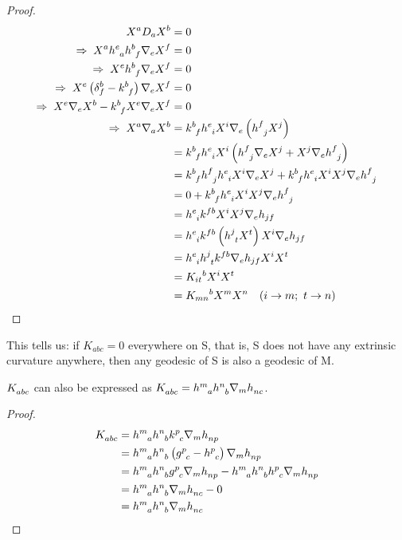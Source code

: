 \begin{proof}
    \begin{align*}
	 X^a D_a X^b &= 0 \\
	\Rightarrow\;  X^a \tt{h}{e}{a} \tt{h}{b}{f} \nabla_e X^f &= 0 \\
	\Rightarrow\;  X^e \tt{h}{b}{f} \nabla_e X^f &= 0 \\
	\Rightarrow\;  X^e \lera{\kron{b}{f} - \tt{k}{b}{f}} \nabla_e X^f &= 0 \\
	\Rightarrow\;  X^e \nabla_e X^b - \tt{k}{b}{f} X^e \nabla_e X^f &= 0 \\
	\Rightarrow\;  X^a \nabla_a X^b &= \tt{k}{b}{f} \tt{h}{e}{i} X^i \nabla_e \lera{\tt{h}{f}{j} X^j} \\
	&= \tt{k}{b}{f} \tt{h}{e}{i} X^i \lera{\tt{h}{f}{j} \nabla_e X^j + X^j \nabla_e \tt{h}{f}{j}} \\
	&= \tt{k}{b}{f} \tt{h}{f}{j} \tt{h}{e}{i} X^i \nabla_e X^j + \tt{k}{b}{f} \tt{h}{e}{i} X^i X^j \nabla_e \tt{h}{f}{j} \\
	&= 0 + \tt{k}{b}{f} \tt{h}{e}{i} X^i X^j \nabla_e \tt{h}{f}{j} \\
	&= \tt{h}{e}{i} k^{fb} X^i X^j \nabla_e h_{jf} \\
	&= \tt{h}{e}{i} k^{fb} \lera{\tt{h}{j}{t} X^t} X^i \nabla_e h_{jf} \\
	&= \tt{h}{e}{i} \tt{h}{j}{t} k^{fb} \nabla_e h_{jf} X^i X^t \\
	&= K_{it}{}^{b} X^i X^t \\
	&= K_{mn}{}^{b} X^m X^n \quad (i \to m;\ t \to n)
\end{align*}

\end{proof}

This tells us: if $ K_{abc}=0$ everywhere on S, that is, S does not have any extrinsic curvature anywhere, then any geodesic of S is also a geodesic of M. 

\begin{proposition}
    $ \tt{K}{}{abc} $ can also be expressed as $ \tt{K}{}{abc}= \tt{h}{m}{a} \tt{h}{n}{b} \nabla_m \tt{h}{}{nc}$.
\end{proposition}
\begin{proof}
    \begin{align*}
        \tt{K}{}{abc} &= \tt{h}{m}{a} \tt{h}{n}{b} \tt{k}{p}{c} \nabla_m \tt{h}{}{np} \\
        &= \tt{h}{m}{a} \tt{h}{n}{b} \lera{ \tt{g}{p}{c}-\tt{h}{p}{c}}  \nabla_m \tt{h}{}{np} \\
        &=\tt{h}{m}{a} \tt{h}{n}{b}  \tt{g}{p}{c} \nabla_m \tt{h}{}{np}- \tt{h}{m}{a} \tt{h}{n}{b}\tt{h}{p}{c} \nabla_m \tt{h}{}{np}\\
        &= \tt{h}{m}{a} \tt{h}{n}{b}  \nabla_m \tt{h}{}{nc}- 0 \\
        &= \tt{h}{m}{a} \tt{h}{n}{b}  \nabla_m \tt{h}{}{nc}
    \end{align*}
\end{proof}





